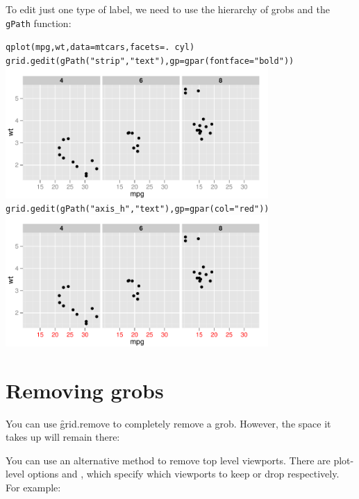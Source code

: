 To edit just one type of label, we need to use the hierarchy of grobs and the {\tt gPath} function:

\begin{alltt}
qplot(mpg, wt, data = mtcars, facets = . ~ cyl)
grid.gedit(gPath("strip","text"), gp = gpar(fontface="bold"))
\includegraphics[width=0.75\textwidth]{grid3}
grid.gedit(gPath("axis_h", "text"), gp = gpar(col="red"))
\includegraphics[width=0.75\textwidth]{grid4}
\end{alltt}

\section{Removing grobs}
\label{sec:grid-delete}

You can use \f{grid.remove} to completely remove a grob.  However, the space it takes up will remain there:

% 


You can use an alternative method to remove top level viewports.  There are plot-level options  and , which specify which viewports to keep or drop respectively.  For example:

